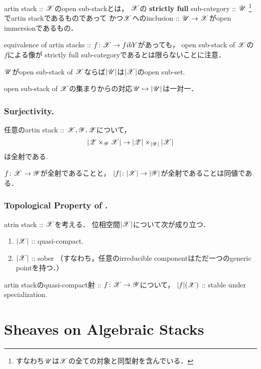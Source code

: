 \documentclass[a4paper, dvipdfmx]{jsarticle}
\begin{document}
\begin{Def}
    artin stack :: $\mathscr{X}$のopen sub-stackとは，
    $\mathscr{X}$の \textbf{strictly full} sub-category :: $\mathscr{U}$
    \footnote{ すなわち$\mathscr{U}$は$\mathscr{X}$の全ての対象と同型射を含んでいる． }
    でartin stackであるものであって
    かつ$\mathscr{X}$へのinclusion :: $\mathscr{U} \to \mathscr{X}$がopen immersionであるもの．
\end{Def}

\begin{Remark}
    equivalence of artin stacks :: $f \colon \mathscr{X} \to fibY$があっても，
    open sub-stack of $\mathscr{X}$の$f$による像が
    strictly full sub-categoryであるとは限らないことに注意．
\end{Remark}

\begin{Prop}\label{prop:Uto|U|}
\begin{myenum}
    \item $\mathscr{U}$がopen sub-stack of $\mathscr{X}$ならば$|\mathscr{U}|$は$|\mathscr{X}|$のopen sub-set.
    \item open sub-stack of $\mathscr{X}$の集まりからの対応$\mathscr{U} \mapsto |\mathscr{U}|$は一対一．
\end{myenum}
\end{Prop}

\subsubsection{Surjectivity.}
\begin{Lemma}
    任意のartin stack :: $\mathscr{X}, \mathscr{Y}, \mathscr{Z}$について，
    \[ |\mathscr{Z} \times_{\mathscr{Y}} \mathscr{X}| \to |\mathscr{Z}| \times _{|\mathscr{Y}|} |\mathscr{X}| \]
    は全射である.
\end{Lemma}

\begin{Lemma}
    $f \colon \mathscr{X} \to \mathscr{Y}$が全射であることと，
    $|f|\colon |\mathscr{X}| \to |\mathscr{Y}|$が全射であることは同値である．
\end{Lemma}

\subsubsection{Topological Property of .}
\begin{Prop}
    atrin stack :: $\mathscr{X}$を考える．
    位相空間$|\mathscr{X}|$について次が成り立つ．
    \begin{enumerate}
        \item $|\mathscr{X}|$ :: quasi-compact.
        \item $|\mathscr{X}|$ :: sober
            （すなわち，任意のirreducible componentはただ一つのgeneric pointを持つ．）
    \end{enumerate}
\end{Prop}

\begin{Prop}
    artin stackのquasi-compact射 :: $f \colon \mathscr{X} \to \mathscr{Y}$について，
    $|f|(\mathscr{X})$ :: stable under specialization.
\end{Prop}

\section{Sheaves on Algebraic Stacks}




\end{document}
